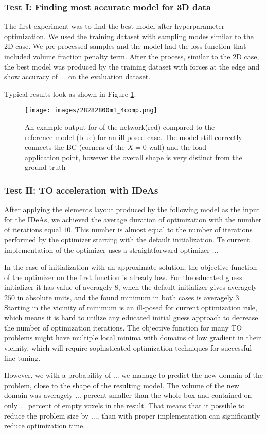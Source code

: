 \subsubsection{Test I: Finding most accurate model for 3D data}

The first experiment was to find the best model after hyperparameter optimization.
We used the training dataset with sampling modes similar to the 2D case.
We pre-processed samples and the model had the loss function that included volume fraction penalty term.
After the process, similar to the 2D case, the best model was produced by the training dataset with forces at the edge and show accuracy of ... on the evaluation dataset. 

Typical results look as shown in Figure \ref{fig:3dres_ex}.
\begin{figure}[h]
	\centering
	\texttt{[image: images/28282800m1\_4comp.png]}
	\caption{An example output for of the network(red) compared to the reference model (blue) for an ill-posed case. The model still correctly connects the BC (corners of the $X=0$ wall) and the load application point, however the overall shape is very distinct from the ground truth}
	\label{fig:3dres_ex}
\end{figure}

\subsubsection{Test II: TO acceleration with IDeAs}

After applying the elements layout produced by the following model as the input for the IDeAs, we achieved the average duration of optimization with the number of iterations equal $10$. 
This number is almost equal to the number of iterations performed by the optimizer starting with the default initialization. 
Te current implementation of the optimizer uses a straightforward optimizer ...
\medskip

In the case of initialization with an approximate solution, the objective function of the optimizer on the first function is already low. 
For the educated guess initializer it has value of averagely $8$, when the default initializer gives averagely $250$ in absolute units, and the found minimum in both cases is averagely $3$.
Starting in the vicinity of minimum is an ill-posed for current optimization rule, which means it is hard to utilize any educated initial guess approach to decrease the number of optimization iterations.
The objective function for many TO problems might have multiple local minima with domains of low gradient in their vicinity, which will require sophisticated optimization techniques for successful fine-tuning.

However, we with a probability of ... we manage to predict the new domain of the problem, close to the shape of the resulting model. 
The volume of the new domain was averagely ... percent smaller than the whole box and contained on only ... percent of empty voxels in the result.
That means that it possible to reduce the problem size by ..., than with proper implementation can significantly reduce optimization time. 

 



